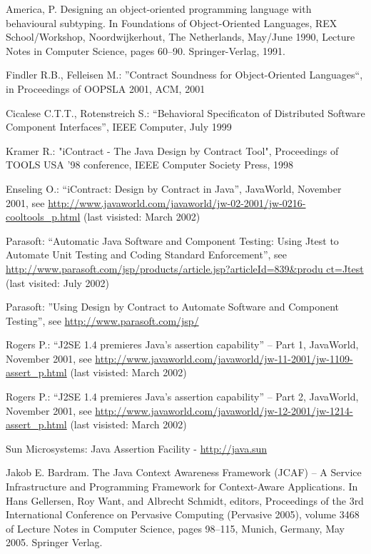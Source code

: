 \begin{thebibliography}{1}
{
America, P. Designing an object-oriented programming
language with behavioural subtyping. In Foundations of
Object-Oriented Languages, REX School/Workshop,
Noordwijkerhout, The Netherlands, May/June 1990, Lecture
Notes in Computer Science, pages 60–90. Springer-Verlag,
1991.

Findler R.B., Felleisen M.: ''Contract Soundness for Object-Oriented
Languages``, in Proceedings of OOPSLA 2001, ACM, 2001

Cicalese C.T.T., Rotenstreich S.: “Behavioral Specificaton of
Distributed Software Component Interfaces”, IEEE Computer, July
1999


Kramer R.: "iContract - The Java Design by Contract Tool",
Proceedings of TOOLS USA '98 conference, IEEE Computer Society
Press, 1998


 Enseling O.: “iContract: Design by Contract in
Java”, JavaWorld, November 2001, see
\url{http://www.javaworld.com/javaworld/jw-02-2001/jw-0216-cooltools_p.html}
(last visisted: March 2002)

Parasoft: “Automatic Java Software and Component Testing: Using
Jtest to Automate Unit Testing and Coding Standard Enforcement”,
see
\url{http://www.parasoft.com/jsp/products/article.jsp?articleId=839&produ
ct=Jtest} (last visited: July 2002)


Parasoft: ''Using Design by Contract to Automate Software and
Component Testing'', see
\url{http://www.parasoft.com/jsp/}

Rogers P.: “J2SE 1.4 premieres Java’s assertion capability”
– Part 1, JavaWorld, November 2001, see
\url{http://www.javaworld.com/javaworld/jw-11-2001/jw-1109-
assert_p.html} (last visisted: March 2002)

 Rogers P.: “J2SE 1.4 premieres Java’s assertion capability”
– Part 2, JavaWorld, November 2001,
see \url{http://www.javaworld.com/javaworld/jw-12-2001/jw-1214-
assert_p.html} (last visisted: March 2002)

 Sun Microsystems: Java Assertion Facility -
\url{http://java.sun}

Jakob E. Bardram. The Java Context Awareness Framework (JCAF) –
A Service Infrastructure and Programming Framework for Context-Aware
Applications. In Hans Gellersen, Roy Want, and Albrecht Schmidt, editors,
Proceedings of the 3rd International Conference on Pervasive Computing
(Pervasive 2005), volume 3468 of Lecture Notes in Computer Science, pages
98–115, Munich, Germany, May 2005. Springer Verlag.


}
\end{thebibliography}
